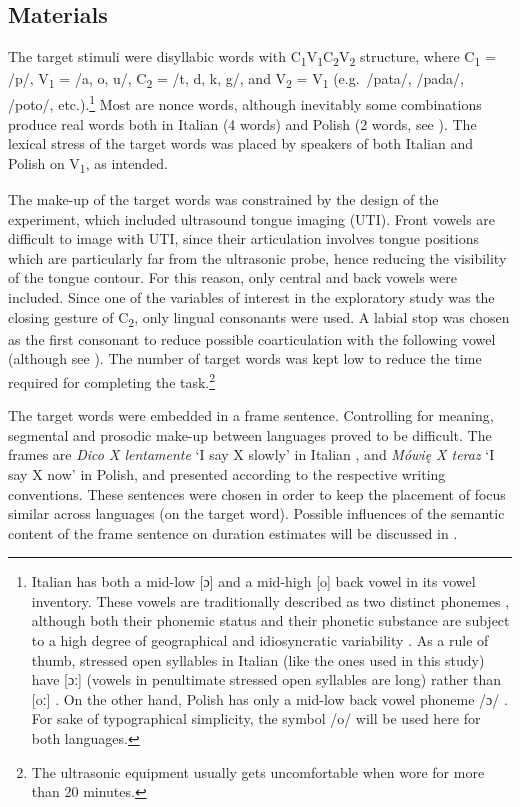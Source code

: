 \documentclass[12pt,]{article}
\let\rmarkdownfootnote\footnote%
\def\footnote{\protect\rmarkdownfootnote}
\begin{document}
\hypertarget{materials}{%
\subsection{Materials}\label{materials}}

\label{s:materials}

The target stimuli were disyllabic words with
C\textsubscript{1}V\textsubscript{1}C\textsubscript{2}V\textsubscript{2}
structure, where C\textsubscript{1} = /p/, V\textsubscript{1} = /a, o,
u/, C\textsubscript{2} = /t, d, k, g/, and V\textsubscript{2} =
V\textsubscript{1} (e.g.~/pata/, /pada/, /poto/,
etc.).\footnote{Italian has both a mid-low [ɔ] and a mid-high [o] back vowel in its vowel inventory. These vowels are traditionally described as two distinct phonemes \citep{kramer2009}, although both their phonemic status and their phonetic substance are subject to a high degree of geographical and idiosyncratic variability \citep{renwick2016}. As a rule of thumb, stressed open syllables in Italian (like the ones used in this study) have [ɔː] (vowels in penultimate stressed open syllables are long) rather than [oː] \citep{renwick2016}. On the other hand, Polish has only a mid-low back vowel phoneme /ɔ/ \citep{gussmann2007}. For sake of typographical simplicity, the symbol /o/ will be used here for both languages.}
Most are nonce words, although inevitably some combinations produce real
words both in Italian (4 words) and Polish (2 words, see
). The lexical stress of the target words was placed by
speakers of both Italian and Polish on V\textsubscript{1}, as intended.

The make-up of the target words was constrained by the design of the
experiment, which included ultrasound tongue imaging (UTI). Front vowels
are difficult to image with UTI, since their articulation involves
tongue positions which are particularly far from the ultrasonic probe,
hence reducing the visibility of the tongue contour. For this reason,
only central and back vowels were included. Since one of the variables
of interest in the exploratory study was the closing gesture of
C\textsubscript{2}, only lingual consonants were used. A labial stop was
chosen as the first consonant to reduce possible coarticulation with the
following vowel (although see \citealt{vazquez-alvarez2007}). The number
of target words was kept low to reduce the time required for completing
the
task.\footnote{The ultrasonic equipment usually gets uncomfortable when wore for more than 20 minutes.
}

The target words were embedded in a frame sentence. Controlling for
meaning, segmental and prosodic make-up between languages proved to be
difficult. The frames are \emph{Dico X lentamente} `I say X slowly' in
Italian \citep[following][]{hajek2008}, and \emph{Mówię X teraz} `I say
X now' in Polish, and presented according to the respective writing
conventions. These sentences were chosen in order to keep the placement
of focus similar across languages (on the target word). Possible
influences of the semantic content of the frame sentence on duration
estimates will be discussed in .
\end{document}
